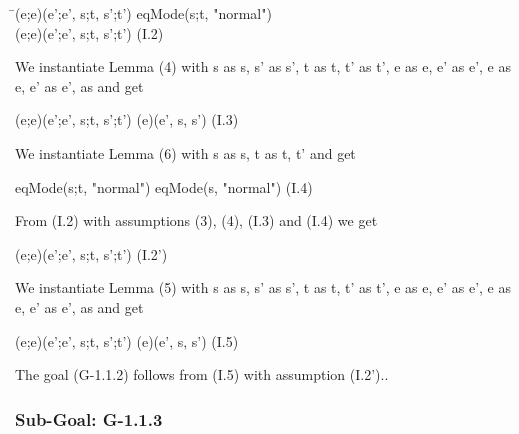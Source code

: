 \documentclass[conference]{IEEEtran}
\begin{document}
\begin{center}
\begin{tabbing}
\textlbrackdbl \=\textrbrackdbl(e;e)(e';e', s;t, s';t')  eqMode(s;t, "normal") 
\\\> \textlbrackdbl \textrbrackdbl(e;e)(e';e', s;t, s';t')   \hspace*{3cm} (I.2)
\end{tabbing}
\end{center}

\noindent We instantiate Lemma (4) with
s as s, s' as s', t as t, t' as t', e as e, e' as e', e as e, e' as e',  as 
and get

\begin{center}
\begin{tabbing}
\textlbrackdbl \textrbrackdbl(e;e)(e';e', s;t, s';t')  \textlbrackdbl \textrbrackdbl(e)(e', s, s')   \hspace*{0.8cm} (I.3)
\end{tabbing}
\end{center}

\noindent We instantiate Lemma (6) with
s as s, t as t, t' and get

\begin{center}
eqMode(s;t, "normal")  eqMode(s, "normal")   \hspace*{0.4cm} (I.4)
\end{center}

\noindent From (I.2) with assumptions (3), (4), (I.3) and (I.4) we get

\begin{center}
\textlbrackdbl \textrbrackdbl(e;e)(e';e', s;t, s';t')   \hspace*{3cm} (I.2')
\end{center}

\noindent We instantiate Lemma (5) with
s as s, s' as s', t as t, t' as t', e as e, e' as e', e as e, e' as e',  as 
and get

\begin{center}
\begin{tabbing}
\textlbrackdbl \textrbrackdbl(e;e)(e';e', s;t, s';t')  \textlbrackdbl \textrbrackdbl(e)(e', s, s')   \hspace*{0.8cm} (I.5)
\end{tabbing}
\end{center}

\noindent The goal (G-1.1.2) follows from (I.5) with assumption (I.2')..

\subsubsection*{Sub-Goal: G-1.1.3}
\end{document}
